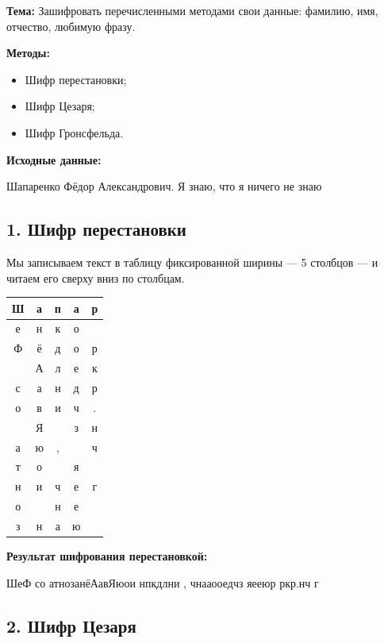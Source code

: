 \documentclass[a4paper,12pt]{article}
\begin{document}
\textbf{Тема:} Зашифровать перечисленными методами свои данные:
фамилию, имя, отчество, любимую фразу.

\textbf{Методы:}
\begin{itemize}
  \item Шифр перестановки;
  \item Шифр Цезаря;
  \item Шифр Гронсфельда.
\end{itemize}

\textbf{Исходные данные:}

Шапаренко Фёдор Александрович. Я знаю, что я ничего не знаю

\subsection*{1. Шифр перестановки}

Мы записываем текст в таблицу фиксированной ширины — 5 столбцов — и
читаем его сверху вниз по столбцам.

\begin{center}
  \begin{tabular}{|c|c|c|c|c|}
    \hline
    Ш & а & п & а & р \\ \hline
    е & н & к & о &   \\ \hline
    Ф & ё & д & о & р \\ \hline
    & А & л & е & к \\ \hline
    с & а & н & д & р \\ \hline
    о & в & и & ч & . \\ \hline
    & Я &   & з & н \\ \hline
    а & ю & , &   & ч \\ \hline
    т & о &   & я &   \\ \hline
    н & и & ч & е & г \\ \hline
    о &   & н & е &   \\ \hline
    з & н & а & ю &   \\ \hline
  \end{tabular}
\end{center}

\textbf{Результат шифрования перестановкой:}

\begin{center}
  ШеФ со атнозанёАавЯюои нпкдлни , чнааооедчз яееюр ркр.нч г
\end{center}

\subsection*{2. Шифр Цезаря}
\end{document}
